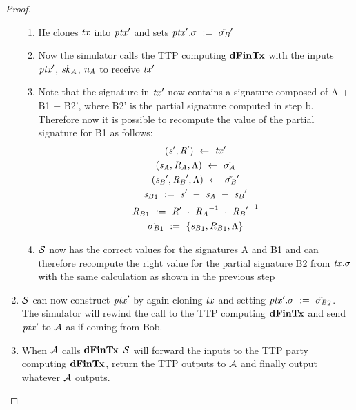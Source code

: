\begin{proof}
\begin{enumerate}
\begin{enumerate}
            \item He clones $\mathit{tx}$ into ${\mathit{ptx}}'$ and sets ${\mathit{ptx}}'.\sigma ~:=~ {\tilde{\sigma_{\mathit{B}}}}'$
            \item Now the simulator calls the TTP computing $\mathbf{dFinTx}$ with the inputs ${\mathit{ptx}}'$, $\mathit{sk}_{\mathit{A}}$, $\mathit{\mathit{n}_{\mathit{A}}}$ to receive ${\mathit{tx}}'$
            \item Note that the signature in ${\mathit{tx}}'$ now contains a signature composed of A + B1 + B2', where B2' is the partial signature computed in step b.
            Therefore now it is possible to recompute the value of the partial signature for B1 as follows:
            \begin{gather*}
                ({\mathit{s}}', {\mathit{R}}') ~\leftarrow~ {\mathit{tx}}' \\
                (\mathit{s}_{\mathit{A}}, \mathit{R}_{\mathit{A}}, \Lambda) ~\leftarrow~ \tilde{\sigma_{\mathit{A}}} \\
                ({\mathit{s}_{\mathit{B}}}', {\mathit{R}_{\mathit{B}}}', \Lambda) ~\leftarrow~ {\tilde{\sigma_{\mathit{B}}}}' \\
                {\mathit{s}_{\mathit{B}}}_1 ~:=~ {\mathit{s}}' ~-~ \mathit{s}_{\mathit{A}} ~-~ {\mathit{s}_{\mathit{B}}}' \\
                {\mathit{R}_{\mathit{B}}}_1 ~:=~ {\mathit{R}}' ~\cdot~ {\mathit{R}_{\mathit{A}}}^{-1} ~\cdot~ {{\mathit{R}_{\mathit{B}}}'}^{-1} \\
                {\tilde{\sigma_{\mathit{B}}}}_1 ~:=~ \{ {\mathit{s}_{\mathit{B}}}_1, {\mathit{R}_{\mathit{B}}}_1, \Lambda \}
            \end{gather*}
            \item $\mathcal{S}$ now has the correct values for the signatures A and B1 and can therefore recompute the right value for the partial signature B2 from $\mathit{tx}.\sigma$ with the same calculation as shown in the previous step
        \end{enumerate}
        \item $\mathcal{S}$ can now construct ${\mathit{ptx}}'$ by again cloning $\mathit{tx}$ and setting ${\mathit{ptx}}'.\sigma ~:=~ {\tilde{\sigma_{\mathit{B}}}}_2$.
        The simulator will rewind the call to the TTP computing $\mathbf{dFinTx}$ and send ${\mathit{ptx}}'$ to $\mathcal{A}$ as if coming from Bob.
        \item When $\mathcal{A}$ calls $\mathbf{dFinTx}$ $\mathcal{S}$ will forward the inputs to the TTP party computing $\mathbf{dFinTx}$, return the TTP outputs to $\mathcal{A}$ and finally output whatever $\mathcal{A}$ outputs.
    \end{enumerate}


\end{proof}
